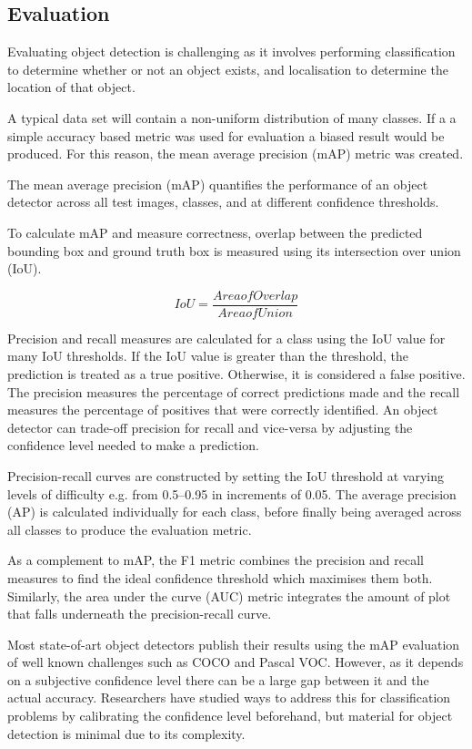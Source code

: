 \documentclass{thesis}
\begin{document}
\subsection{Evaluation}

Evaluating object detection is challenging as it involves performing classification to determine whether or not an object exists, and localisation to determine the location of that object. 

A typical data set will contain a non-uniform distribution of many classes. If a a simple accuracy based metric was used for evaluation a biased result would be produced. For this reason, the mean average precision (mAP) metric was created.

The mean average precision (mAP) quantifies the performance of an object detector across all test images, classes, and at different confidence thresholds.

To calculate mAP and measure correctness, overlap between the predicted bounding box and ground truth box is measured using its intersection over union (IoU). 

\begin{equation}
    IoU = \frac{Area of Overlap}{Area of Union}
\end{equation}

Precision and recall measures are calculated for a class using the IoU value for many IoU thresholds. If the IoU value is greater than the threshold, the prediction is treated as a true positive. Otherwise, it is considered a false positive. The precision measures the percentage of correct predictions made and the recall measures the percentage of positives that were correctly identified. An object detector can trade-off precision for recall and vice-versa by adjusting the confidence level needed to make a prediction.

Precision-recall curves are constructed by setting the IoU threshold at varying levels of difficulty e.g. from 0.5--0.95 in increments of 0.05. The average precision (AP) is calculated individually for each class, before finally being averaged across all classes to produce the evaluation metric.

As a complement to mAP, the F1 metric combines the precision and recall measures to find the ideal confidence threshold which maximises them both. Similarly,
the area under the curve (AUC) metric integrates the amount of plot that falls underneath the precision-recall curve.

Most state-of-art object detectors publish their results using the mAP evaluation of well known challenges such as COCO\cite{lin2015microsoft} and Pascal VOC\cite{Everingham15}. However, as it depends on a subjective confidence level there can be a large gap between it and the actual accuracy\cite{Peng2021}. Researchers have studied ways to address this for classification problems by calibrating the confidence level beforehand\cite{guo2017calibration}, but material for object detection is minimal due to its complexity.
\end{document}
